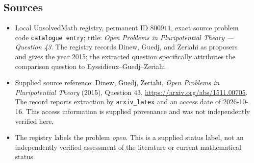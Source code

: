 \documentclass[11pt]{article}
\begin{document}
\subsection{Sources}
\begin{itemize}
\item Local UnsolvedMath registry, permanent ID \(800911\), exact source problem code \texttt{catalogue entry}; title: \emph{Open Problems in Pluripotential Theory --- Question 43}. The registry records Dinew, Guedj, and Zeriahi as proposers and gives the year 2015; the extracted question specifically attributes the comparison question to Eyssidieux--Guedj--Zeriahi.
\item Supplied source reference: Dinew, Guedj, Zeriahi, \emph{Open Problems in Pluripotential Theory} (2015), Question 43, \url{https://arxiv.org/abs/1511.00705}. The record reports extraction by \texttt{arxiv\_latex} and an access date of 2026-10-16. This access information is supplied provenance and was not independently verified here.
\item The registry labels the problem \emph{open}. This is a supplied status label, not an independently verified assessment of the literature or current mathematical status.
\end{itemize}
\end{document}
